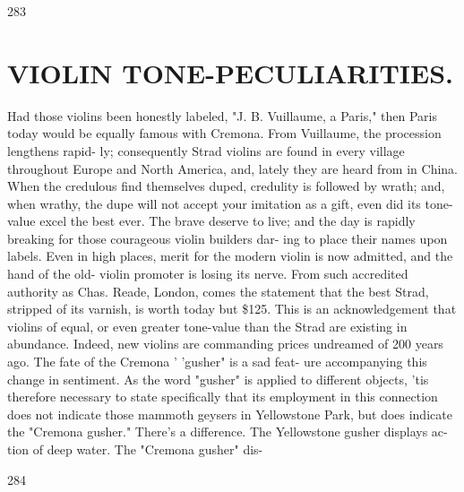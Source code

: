 \documentclass{article}
\begin{document}
283

\section*{VIOLIN TONE-PECULIARITIES.}
Had those violins been honestly labeled, "J. B. Vuillaume, a Paris," then Paris today would be equally famous with Cremona. From Vuillaume, the procession lengthens rapid- ly; consequently Strad violins are found in every village throughout Europe and North America, and, lately they are heard from in China. When the credulous find themselves duped, credulity is followed by wrath; and, when wrathy, the dupe will not accept your imitation as a gift, even did its tone-value excel the best ever. The brave deserve to live; and the day is rapidly breaking for those courageous violin builders dar- ing to place their names upon labels. Even in high places, merit for the modern violin is now admitted, and the hand of the old- violin promoter is losing its nerve. From such accredited authority as Chas. Reade, London, comes the statement that the best Strad, stripped of its varnish, is worth today but \$125. This is an acknowledgement that violins of equal, or even greater tone-value than the Strad are existing in abundance. Indeed, new violins are commanding prices undreamed of 200 years ago. The fate of the Cremona ' 'gusher" is a sad feat- ure accompanying this change in sentiment. As the word "gusher" is applied to different objects, 'tis therefore necessary to state specifically that its employment in this connection does not indicate those mammoth geysers in Yellowstone Park, but does indicate the "Cremona gusher." There's a difference. The Yellowstone gusher displays ac- tion of deep water. The "Cremona gusher" dis-

284
\end{document}
